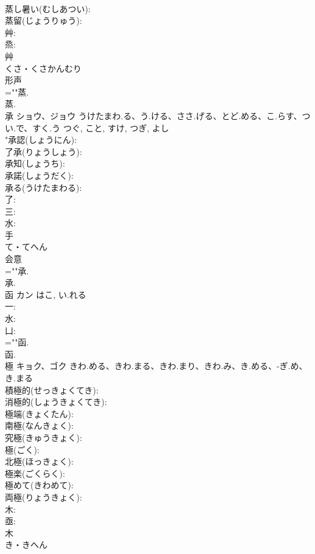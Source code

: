 \documentclass[8pt]{extreport}
\begin{document}
\begin{CJK}{UTF8}{min}
\\	蒸し暑い(むしあつい): 
\\	蒸留(じょうりゅう): 
\\	艸: 
\\	烝: 
\\	艸	
\\	くさ・くさかんむり	
\\	形声 
\\	=""蒸.
\\	蒸.
\\	承	ショウ、ジョウ	うけたまわ.る、う.ける、ささ.げる、とど.める、こ.らす、つい.で、すく.う	つぐ, こと, すけ, つぎ, よし	
\\	"承認(しょうにん): 
\\	了承(りょうしょう): 
\\	承知(しょうち): 
\\	承諾(しょうだく): 
\\	承る(うけたまわる): 
\\	了: 
\\	三: 
\\	水: 
\\	手	
\\	て・てへん	
\\	会意 
\\	=""承.
\\	承.
\\	函	カン	はこ, い.れる		
\\	一: 
\\	水: 
\\	凵: 
\\	=""函.
\\	函.
\\	極	キョク、ゴク	きわ.める、きわ.まる、きわ.まり、きわ.み、き.める、-ぎ.め、き.まる		
\\	積極的(せっきょくてき): 
\\	消極的(しょうきょくてき): 
\\	極端(きょくたん): 
\\	南極(なんきょく): 
\\	究極(きゅうきょく): 
\\	極(ごく): 
\\	北極(ほっきょく): 
\\	極楽(ごくらく): 
\\	極めて(きわめて): 
\\	両極(りょうきょく): 
\\	木: 
\\	亟: 
\\	木	
\\	き・きへん	

\end{CJK}
\end{document}
